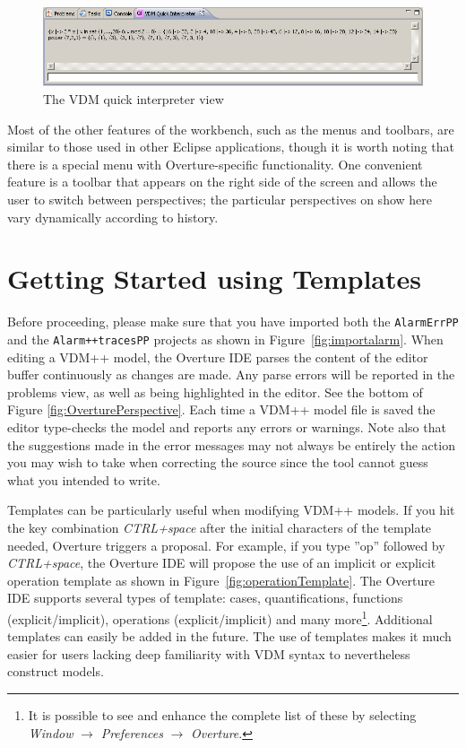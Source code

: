 \begin{figure}[!htb]
\begin{center}
  \includegraphics[width=4.5in]{figures/quickinterpreter}
  \caption[labelInTOC]{The VDM quick interpreter view}
  \label{fig:QuickIntView}
\end{center}
\end{figure}

Most of the other features of the workbench, such as the menus and
toolbars, are similar to those used in other Eclipse applications,
though it is worth noting that there is a special menu with
Overture-specific functionality. One convenient feature is a toolbar
that appears on the right side of the screen and allows the user to
switch between perspectives; the particular perspectives on show here
vary dynamically according to history.



\section{Getting Started using Templates}\label{sec:templates}

Before proceeding, please make sure that you have imported both the
\texttt{AlarmErrPP} and the \texttt{Alarm++tracesPP} projects as shown in
Figure~\ref{fig:importalarm}. When editing a VDM++ model, the Overture IDE parses the content of the
editor buffer continuously as changes are made. Any parse errors will
be reported in the problems view, as well as being highlighted in the
editor. See the bottom of Figure
\ref{fig:OverturePerspective}. Each time a VDM++ model file is
saved the editor type-checks the model and reports any errors or
warnings. Note also that the suggestions made in the error messages
may not always be entirely the action you may wish to take when
correcting the source since the tool cannot guess what you intended
to write.

Templates can be particularly useful when modifying VDM++ models. If you hit
the key combination \textit{CTRL+space} after the initial characters
of the template needed, Overture triggers a proposal. For example, if
you type ''op'' followed by \textit{CTRL+space}, the Overture IDE
will propose the use of an implicit or explicit operation template as
shown in Figure~\ref{fig:operationTemplate}. The Overture IDE
supports several types of template: cases, quantifications, functions
(explicit/implicit), operations (explicit/implicit) and many
more\footnote{It is possible to see and enhance the complete list of
  these by selecting \emph{Window} $\rightarrow$ \emph{Preferences}
  $\rightarrow$ \emph{Overture}.}. 
Additional templates can easily be added in the future. The use
of templates makes it much easier for users lacking deep familiarity
with VDM syntax to nevertheless construct models.

